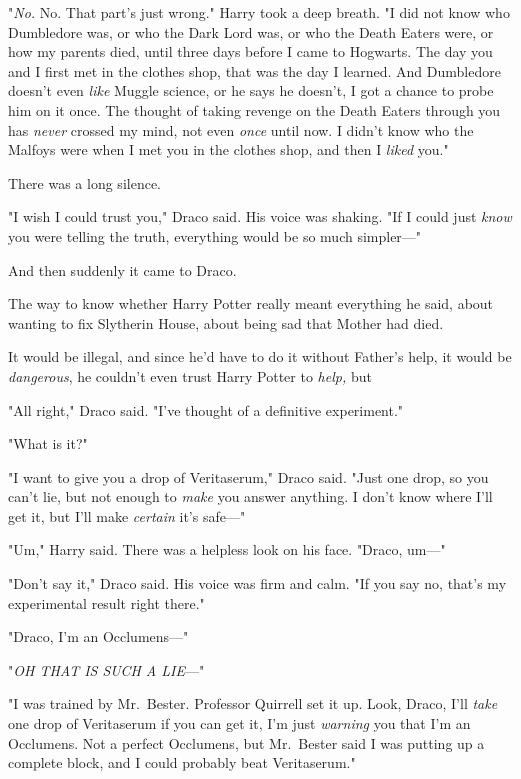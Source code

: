 "\emph{No.} No. That part's just wrong." Harry took a deep breath. "I did not
know who Dumbledore was, or who the Dark Lord was, or who the Death Eaters
were, or how my parents died, until three days before I came to Hogwarts. The
day you and I first met in the clothes shop, that was the day I learned. And
Dumbledore doesn't even \emph{like} Muggle science, or he says he doesn't, I
got a chance to probe him on it once. The thought of taking revenge on the
Death Eaters through you has \emph{never} crossed my mind, not even \emph{once}
until now. I didn't know who the Malfoys were when I met you in the clothes
shop, and then I \emph{liked} you."

There was a long silence.

"I wish I could trust you," Draco said. His voice was shaking. "If I could just
\emph{know} you were telling the truth, everything would be so much simpler\mbox{---}"

And then suddenly it came to Draco.

The way to know whether Harry Potter really meant everything he said, about
wanting to fix Slytherin House, about being sad that Mother had died.

It would be illegal, and since he'd have to do it without Father's help, it
would be \emph{dangerous}, he couldn't even trust Harry Potter to \emph{help,}
but{\el}

"All right," Draco said. "I've thought of a definitive experiment."

"What is it?"

"I want to give you a drop of Veritaserum," Draco said. "Just one drop, so you
can't lie, but not enough to \emph{make} you answer anything. I don't know
where I'll get it, but I'll make \emph{certain} it's safe\mbox{---}"

"Um," Harry said. There was a helpless look on his face. "Draco, um\mbox{---}"

"Don't say it," Draco said. His voice was firm and calm. "If you say no, that's
my experimental result right there."

"Draco, I'm an Occlumens\mbox{---}"

"\emph{OH THAT IS SUCH A LIE}\mbox{---}"

"I was trained by Mr.~Bester. Professor Quirrell set it up. Look, Draco, I'll
\emph{take} one drop of Veritaserum if you can get it, I'm just \emph{warning}
you that I'm an Occlumens. Not a perfect Occlumens, but Mr.~Bester said I was
putting up a complete block, and I could probably beat Veritaserum."

